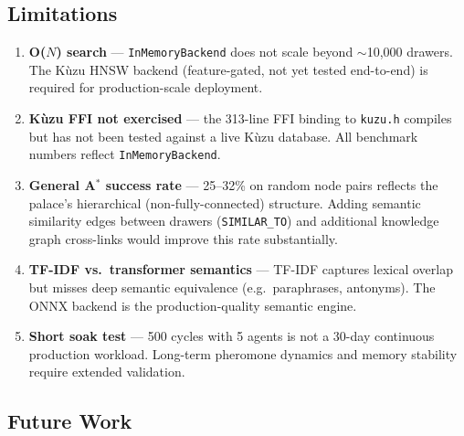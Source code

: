 \documentclass[11pt,a4paper]{article}
\begin{document}
\subsection{Limitations}

\begin{enumerate}[nosep]
\item \textbf{O($N$) search} --- \texttt{InMemoryBackend} does not scale beyond
      $\sim$10,000 drawers.  The Kùzu HNSW backend (feature-gated, not yet
      tested end-to-end) is required for production-scale deployment.
\item \textbf{Kùzu FFI not exercised} --- the 313-line FFI binding to
      \texttt{kuzu.h} compiles but has not been tested against a live Kùzu
      database.  All benchmark numbers reflect \texttt{InMemoryBackend}.
\item \textbf{General A$^*$ success rate} --- 25--32\% on random node pairs
      reflects the palace's hierarchical (non-fully-connected) structure.
      Adding semantic similarity edges between drawers (\texttt{SIMILAR\_TO})
      and additional knowledge graph cross-links would improve this rate
      substantially.
\item \textbf{TF-IDF vs.\ transformer semantics} --- TF-IDF captures lexical
      overlap but misses deep semantic equivalence (e.g.\ paraphrases, antonyms).
      The ONNX backend is the production-quality semantic engine.
\item \textbf{Short soak test} --- 500 cycles with 5 agents is not a 30-day
      continuous production workload.  Long-term pheromone dynamics and memory
      stability require extended validation.
\end{enumerate}

\subsection{Future Work}
\end{document}
